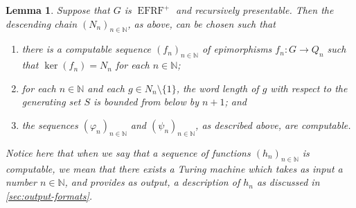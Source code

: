 \documentclass[a4paper]{amsart}
\numberwithin{equation}{section}
\newtheorem{lemma}[theorem]{Lemma}
\theoremstyle{definition}
\theoremstyle{remark}
\newcommand{\N}{\mathbb{N}}
\DeclareMathOperator{\EFRF}{EFRF}
\begin{document}
\begin{lemma}\label{lem:computable-chain-with-Y}
Suppose that $G$ is $\EFRF^{+}$ and recursively presentable.
Then the descending chain $(N_n)_{n \in \N}$, as above, can be chosen such that %
\begin{enumerate}
    \item 
    there is a computable sequence $(f_n)_{n\in \N}$ of epimorphisms $f_n\colon G\to Q_n$ such that $\ker(f_n)=N_n$ for each $n\in \N$;
    \item 
    for each $n\in \N$ and each $g\in N_n\setminus \{1\}$, the word length of $g$ with respect to the generating set $S$ is bounded from below by $n+1$; 
    and
    \item 
    the sequences $(\varphi_n)_{n\in \N}$ and $(\psi_n)_{n\in \N}$, as described above, are computable.
\end{enumerate}
Notice here that when we say that a sequence of functions $(h_n)_{n\in \N}$ is \emph{computable}, we mean that there exists a Turing machine which takes as input a number $n\in \N$, and provides as output, a description of $h_n$ as discussed in \cref{sec:output-formats}.
\end{lemma}
\end{document}
